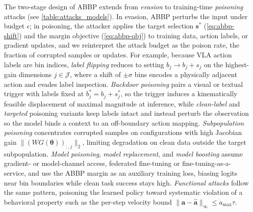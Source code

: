  The two-stage design of ABBP extends from \emph{evasion} to training-time \emph{poisoning} attacks (see \autoref{table:attacks_models}). In evasion, ABBP perturbs the input under budget $\epsilon$; in poisoning, the attacker applies the target selection $\bm{s}^{*}$ (\autoref{eq:abbp-shift}) and the margin objective (\autoref{eq:abbp-obj}) to training data, action labels, or gradient updates, and we reinterpret the attack budget as the poison rate, \ie the fraction of corrupted samples or updates. For example,
because VLA action labels are bin indices, \emph{label flipping} reduces to setting $b_j \rightarrow b_j+s_j$ on the highest-gain dimensions $j\in\mathcal{J}$, where a shift of $\pm\sigma$ bins encodes a physically adjacent action and evades label inspection. 
\emph{Backdoor poisoning} pairs a visual or textual trigger with labels fixed at $b_j^{*}=b_j+s_j^{*}$, so the trigger induces a kinematically feasible displacement of maximal magnitude at inference, while \emph{clean-label} and \emph{targeted} poisoning variants keep labels intact and instead perturb the observation so the model binds a context to an off-boundary action mapping. \emph{Subpopulation poisoning} concentrates corrupted samples on configurations with high Jacobian gain $\|(WG(\bm{\theta}))_{:,j}\|_{2}$, limiting degradation on clean data outside the target subpopulation. \emph{Model poisoning}, \emph{model replacement}, and \emph{model boosting} assume gradient- or model-channel access, \eg federated fine-tuning or fine-tuning-as-a-service, and use the ABBP margin as an auxiliary training loss, biasing logits near bin boundaries while clean task success stays high. \emph{Functional attacks} follow the same pattern, poisoning the learned policy toward systematic violation of a behavioral property such as the per-step velocity bound $\|\bm{a}-\hat{\bm{a}}\|_{\infty}\le\dot a_{\max}\tau$. 



